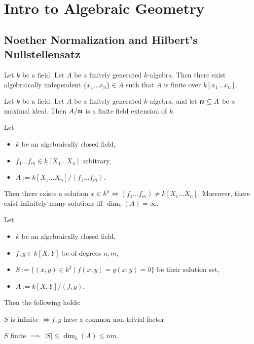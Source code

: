 \section{Intro to Algebraic Geometry}

\subsection{Noether Normalization and Hilbert's Nullstellensatz}

\begin{theorem}
    Let $k$ be a field. Let $A$ be a finitely generated $k$-algebra. Then there exist algebraically independent $\{x_1\ldots x_n\}\in A$ such that $A$ is finite over $k[x_1\ldots x_n]$.
\end{theorem}

\begin{theorem}
    Let $k$ be a field. Let $A$ be a finitely generated $k$-algebra, and let $\mathfrak{m} \subseteq A$ be a maximal ideal. Then $A/\mathfrak{m}$ is a finite field extension of $k$.
\end{theorem}

\begin{theorem}
    Let 
    \begin{itemize}
        \item $k$ be an algebraically closed field,  
        \item $f_1\ldots f_m\in k[X_1\ldots X_n]$ arbitrary,
        \item $A:= k[X_1\ldots X_n] / (f_1\ldots f_m).$
    \end{itemize}
    Then there exists a solution $x\in k^n \iff (f_1\ldots f_m) \neq k[X_1\ldots X_n].$ Moreover, there exist infinitely many solutions iff $\dim_k(A)=\infty$.
\end{theorem}

\begin{theorem}
    Let
    \begin{itemize}
        \item $k$ be an algebraically closed field,
        \item $f,g\in k[X,Y]$ be of degrees $n,m$,
        \item $S:=\{(x,y)\in k^2 \mid f(x,y)=g(x,y)=0\}$ be their solution set,
        \item $A:=k[X,Y]/(f,g)$. 
    \end{itemize}
    
    Then the following holds: 
    
    $S$ is infinite $\iff f,g$ have a common non-trivial factor

    $S$ finite $\implies$ $|S|\leq \dim_k(A) \leq nm$. 
\end{theorem}

